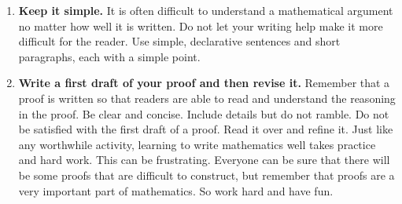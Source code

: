 \begin{enumerate}
\item \textbf{Keep it simple.}  
It is often difficult to understand a mathematical argument no matter how well it is written.  Do not let your writing help make it more difficult for the reader.  Use simple, declarative sentences and short paragraphs, each with a simple point.


\item \textbf{Write a first draft of your proof and then revise it.} 
Remember that a proof is written so that readers are able to read and understand the reasoning in the proof.  Be clear and concise.  Include details but do not ramble.  Do not be satisfied with the first draft of a proof.  Read it over and refine it.  Just like any worthwhile activity, learning to write mathematics well takes practice and hard work.  This can be frustrating.  Everyone can be sure that there will be some proofs that are difficult to construct, but remember that proofs are a very important part of mathematics.  So work hard and have fun.
\end{enumerate}


\endinput

